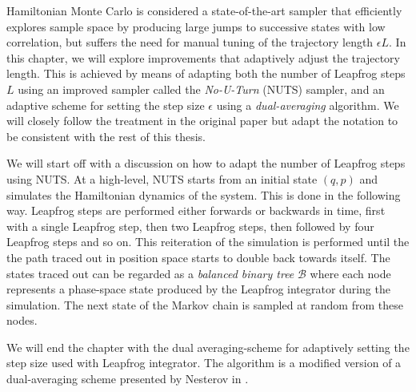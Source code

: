 Hamiltonian Monte Carlo is considered a state-of-the-art sampler that efficiently explores sample space by producing large jumps to successive states with low correlation, 
but suffers the need for manual tuning of the trajectory length $\epsilon L$. 
In this chapter, we will explore improvements that adaptively adjust the trajectory length. This is achieved by means of adapting both the number of Leapfrog steps $L$ using an improved sampler called the \textit{No-U-Turn} (NUTS) sampler, and an adaptive scheme for setting the step size $\epsilon$ using a \textit{dual-averaging} algorithm. We will closely follow the treatment in the original paper \cite{nuts} but adapt the notation to be consistent with the rest of this thesis.

We will start off with a discussion on how to adapt the number of Leapfrog steps using NUTS. At a high-level, NUTS starts from an initial state $(q, p)$ and simulates the Hamiltonian dynamics of the system. This is
done in the following way. Leapfrog steps are performed either forwards or backwards in time, first with a single Leapfrog step, then two Leapfrog steps, then followed by four Leapfrog steps and so on. This reiteration of the simulation is performed until the the path traced out in position space starts to double back towards itself. The states traced out can be regarded as a \textit{balanced binary tree} $\mathcal{B}$ where
each node represents a phase-space state produced by the Leapfrog integrator during the simulation. The next state of the Markov chain is sampled at random from these nodes.  

We will end the chapter with the dual averaging-scheme for adaptively setting the step size used with Leapfrog integrator. The algorithm is a modified version of a dual-averaging scheme presented by Nesterov in \cite{Nesterov2009}.


